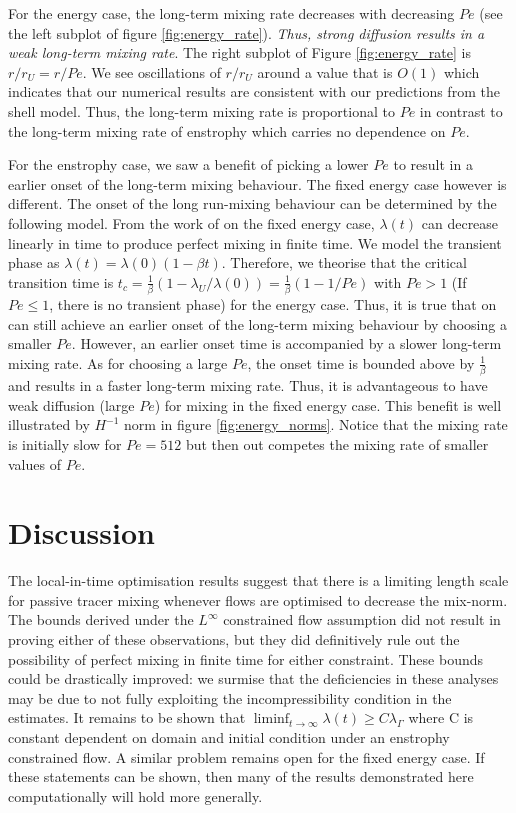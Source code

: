 \documentclass[12pt]{iopart}
\begin{document}
For the energy case, the long-term mixing rate decreases with decreasing $Pe$ (see the left subplot of figure \ref{fig:energy_rate}).  {\it Thus, strong diffusion results in a weak long-term mixing rate}. The right subplot of Figure \ref{fig:energy_rate} is $r/r_{U} =  r/Pe$. We see oscillations of $r/r_{U}$ around a value that is $O(1)$ which indicates that our numerical results are consistent with our predictions from the shell model. Thus, the long-term mixing rate is proportional to $Pe$ in contrast to the long-term mixing rate of enstrophy which carries no dependence on $Pe$.

 For the enstrophy case, we saw a benefit of picking a lower $Pe$ to result in a earlier onset of the long-term mixing behaviour. The fixed energy case however is different. The onset of the long run-mixing behaviour can be determined by the following model. From the work of \cite{JMP2012} on the fixed energy case, $\lambda(t)$ can decrease linearly in time to produce perfect mixing in finite time. We model the transient phase as $\lambda(t)=\lambda(0)(1-\beta t)$. Therefore, we theorise that the critical transition time is $t_{c}=\frac{1}{\beta}(1 -\lambda_{U}/\lambda(0)) = \frac{1}{\beta}(1 - 1/Pe)$ with $Pe> 1$ (If $Pe \leq 1$, there is no transient phase) for the energy case. Thus, it is true that on can still achieve an earlier onset of the long-term mixing behaviour by choosing a smaller $Pe$. However, an earlier onset time is accompanied by a slower long-term mixing rate. As for choosing a large $Pe$, the onset time is bounded above by $\frac{1}{\beta}$ and results in a faster long-term mixing rate. Thus, it is advantageous to have weak diffusion (large $Pe$) for mixing in the fixed energy case. This benefit is well illustrated by $H^{-1}$ norm in figure \ref{fig:energy_norms}. Notice that the mixing rate is initially slow for $Pe = 512$ but then out competes the mixing rate of smaller values of $Pe$.    


\section{Discussion}
\label{sec:discussion}
The local-in-time optimisation results suggest that there is a limiting length scale for passive tracer mixing whenever flows are optimised to decrease the mix-norm. The bounds derived under the $L^{\infty}$ constrained flow assumption did not result in proving either of these observations, but they did definitively rule out the possibility of perfect mixing in finite time for either constraint. These bounds could be drastically improved: we surmise that the deficiencies in these analyses may be due to not fully exploiting the incompressibility condition in the estimates. It remains to be shown that $\liminf_{t\rightarrow \infty} \lambda (t)\geq C\lambda_{\Gamma}$ where C is constant dependent on domain and initial condition under an enstrophy constrained flow. A similar problem remains open for the fixed energy case.  If these statements can be shown, then many of the results demonstrated here computationally will hold more generally. 
\end{document}
